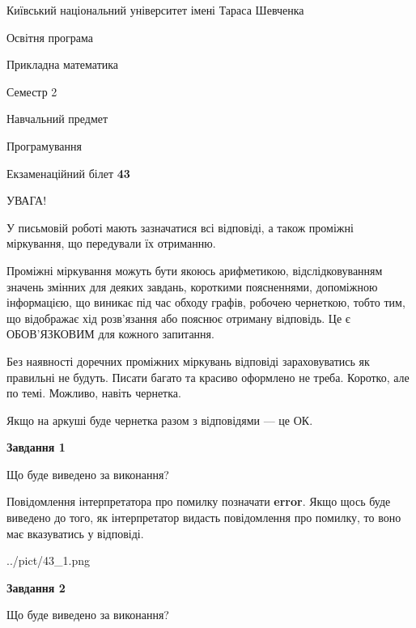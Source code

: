 \documentclass[12pt, ukrainian]{article}
\begin{document}
{{\begin {small}\par
{ \center  Київський національний університет імені Тараса Шевченка \par}
{\parbox {5 cm}{Освітня програма \hfill}{\parbox {7 cm}{Прикладна математика \hfill}}\parbox {6 cm}{\hfill Семестр 2}}\par
{\parbox {5 cm} {Навчальний предмет \hfill}\parbox {7 cm}{Програмування \hfill}\parbox {6cm}{\hfill}\par}\vspace{-7pt} \end{small}}{\center Екзаменаційний білет \No \textbf
{ 43 }\par}}
{
\begin {large}
УВАГА!

У письмовій роботі мають зазначатися всі відповіді, а також проміжні міркування, що передували їх отриманню.

Проміжні міркування можуть бути якоюсь арифметикою, відслідковуванням зна\-чень змінних для деяких завдань,
короткими поясненнями, допоміжною інформацією, що виникає під час обходу графів, робочею чернеткою,
тобто тим, що відображає хід розв’язання або пояснює отриману відповідь.
Це є ОБОВ’ЯЗКОВИМ для кожного запитання.

Без наявності доречних проміжних міркувань відповіді зараховуватись як правиль\-ні не будуть.
Писати багато та красиво оформлено не треба. Коротко, але по темі. Можли\-во, навіть чернетка.

Якщо на аркуші буде чернетка разом з відповідями --- це ОК.

\newpage

{\begin {center}\textbf{Завдання 1}\end {center}}\par
Що буде виведено за виконання?

Повідомлення інтерпретатора про помилку позначати \textbf{error}.
Якщо щось буде виведено до того, як інтерпретатор видасть повідомлення про помилку, 
то воно має вказуватись у відповіді. \par


\begin{center}
	{../pict/43_1.png}
\end{center}
\newpage

{\begin {center}\textbf{Завдання 2}\end {center}}\par
Що буде виведено за виконання?


\end{large}}
\end{document}
